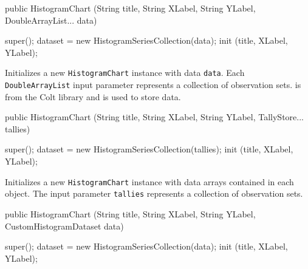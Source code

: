 \begin{htmlonly}
\end{htmlonly}
\begin{code}

   public HistogramChart (String title, String XLabel, String YLabel,
                          DoubleArrayList... data) \begin{hide} {
      super();
      dataset = new HistogramSeriesCollection(data);
      init (title, XLabel, YLabel);
   }\end{hide}
\end{code}
\begin{tabb}
   Initializes a new \texttt{HistogramChart} instance with data \texttt{data}.
   Each \texttt{DoubleArrayList} input parameter represents a collection of
   observation sets.
    is from the Colt library
   and is used to store data.
\end{tabb}
\begin{htmlonly}
\end{htmlonly}
\begin{code}

   public HistogramChart (String title, String XLabel, String YLabel,
                          TallyStore... tallies) \begin{hide} {
      super();
      dataset = new HistogramSeriesCollection(tallies);
      init (title, XLabel, YLabel);
   }\end{hide}
\end{code}
\begin{tabb}
   Initializes a new \texttt{HistogramChart} instance with data arrays contained in each
    object.
   The input parameter \texttt{tallies} represents a collection of observation sets.
\end{tabb}
\begin{htmlonly}
\end{htmlonly}
\begin{code}

   public HistogramChart (String title, String XLabel, String YLabel,
                          CustomHistogramDataset data) \begin{hide} {
      super();
      dataset = new HistogramSeriesCollection(data);
      init (title, XLabel, YLabel);
   }\end{hide}
\end{code}
